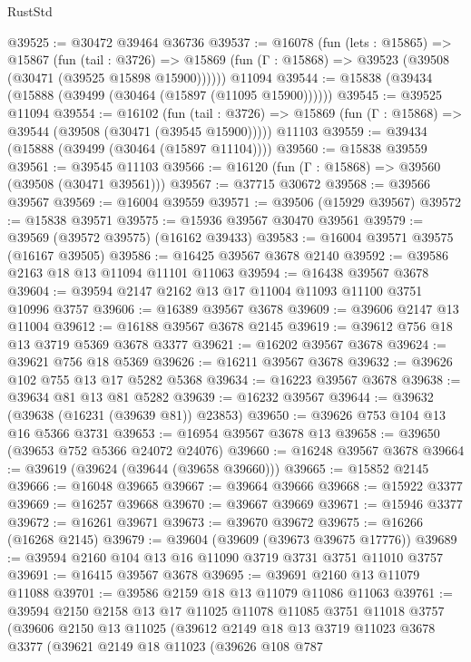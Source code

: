 \begin{lexlean}{RustStd}
\begin{coremodule}
@39525 := @30472 @39464 @36736
@39537 := @16078
    (fun (lets : @15865) =>
    @15867
      (fun (tail : @3726) =>
      @15869 (fun (Γ : @15868) => @39523 (@39508 (@30471 (@39525 @15898 @15900))))))
    @11094
@39544 := @15838 (@39434 (@15888 (@39499 (@30464 (@15897 (@11095 @15900))))))
@39545 := @39525 @11094
@39554 := @16102
    (fun (tail : @3726) => @15869 (fun (Γ : @15868) => @39544 (@39508 (@30471 (@39545 @15900)))))
    @11103
@39559 := @39434 (@15888 (@39499 (@30464 (@15897 @11104))))
@39560 := @15838 @39559
@39561 := @39545 @11103
@39566 := @16120 (fun (Γ : @15868) => @39560 (@39508 (@30471 @39561)))
@39567 := @37715 @30672
@39568 := @39566 @39567
@39569 := @16004 @39559
@39571 := @39506 (@15929 @39567)
@39572 := @15838 @39571
@39575 := @15936 @39567 @30470 @39561
@39579 := @39569 (@39572 @39575) (@16162 @39433)
@39583 := @16004 @39571 @39575 (@16167 @39505)
@39586 := @16425 @39567 @3678 @2140
@39592 := @39586 @2163 @18 @13 @11094 @11101 @11063
@39594 := @16438 @39567 @3678
@39604 := @39594 @2147 @2162 @13 @17 @11004 @11093 @11100 @3751 @10996 @3757
@39606 := @16389 @39567 @3678
@39609 := @39606 @2147 @13 @11004
@39612 := @16188 @39567 @3678 @2145
@39619 := @39612 @756 @18 @13 @3719 @5369 @3678 @3377
@39621 := @16202 @39567 @3678
@39624 := @39621 @756 @18 @5369
@39626 := @16211 @39567 @3678
@39632 := @39626 @102 @755 @13 @17 @5282 @5368
@39634 := @16223 @39567 @3678
@39638 := @39634 @81 @13 @81 @5282
@39639 := @16232 @39567
@39644 := @39632 (@39638 (@16231 (@39639 @81)) @23853)
@39650 := @39626 @753 @104 @13 @16 @5366 @3731
@39653 := @16954 @39567 @3678 @13
@39658 := @39650 (@39653 @752 @5366 @24072 @24076)
@39660 := @16248 @39567 @3678
@39664 := @39619 (@39624 (@39644 (@39658 @39660)))
@39665 := @15852 @2145
@39666 := @16048 @39665
@39667 := @39664 @39666
@39668 := @15922 @3377
@39669 := @16257 @39668
@39670 := @39667 @39669
@39671 := @15946 @3377
@39672 := @16261 @39671
@39673 := @39670 @39672
@39675 := @16266 (@16268 @2145)
@39679 := @39604 (@39609 (@39673 @39675 @17776))
@39689 := @39594 @2160 @104 @13 @16 @11090 @3719 @3731 @3751 @11010 @3757
@39691 := @16415 @39567 @3678
@39695 := @39691 @2160 @13 @11079 @11088
@39701 := @39586 @2159 @18 @13 @11079 @11086 @11063
@39761 := @39594
    @2150
    @2158
    @13
    @17
    @11025
    @11078
    @11085
    @3751
    @11018
    @3757
    (@39606
      @2150
      @13
      @11025
      (@39612
        @2149
        @18
        @13
        @3719
        @11023
        @3678
        @3377
        (@39621
          @2149
          @18
          @11023
          (@39626
            @108
            @787

\end{coremodule}
\end{lexlean}
